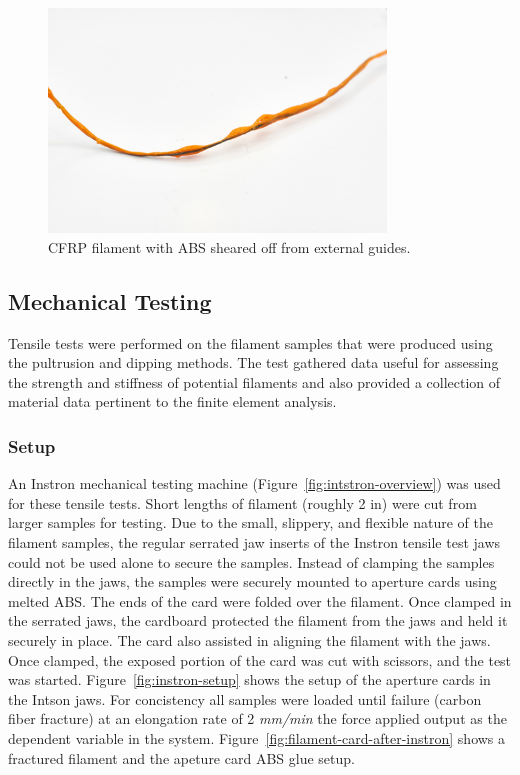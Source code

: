 \begin{figure}[htp]
    \centering
    \includegraphics[width=0.8\textwidth]{./figures/filament-dipping-shear}
    \caption{CFRP filament with ABS sheared off from external guides.}
    \label{fig:filament-dipping-shear}
\end{figure}

\clearpage

\subsection{Mechanical Testing}

\indent

Tensile tests were performed on the filament samples that were produced using the pultrusion and dipping methods. The test gathered data useful for assessing the strength and stiffness of potential filaments and also provided a collection of material data pertinent to the finite element analysis.\\

\subsubsection{Setup}

\indent

An Instron mechanical testing machine (Figure~\ref{fig:intstron-overview}) was used for these tensile tests. Short lengths of filament (roughly 2 in) were cut from larger samples for testing. Due to the small, slippery,  and flexible nature of the filament samples, the regular serrated jaw inserts of the Instron tensile test jaws could not be used alone to secure the samples. Instead of clamping the samples directly in the jaws, the samples were securely mounted to aperture cards using melted ABS. The ends of the card were folded over the filament. Once clamped in the serrated jaws, the cardboard protected the filament from the jaws and held it securely in place. The card also assisted in aligning the filament with the jaws. Once clamped, the exposed portion of the card was cut with scissors, and the test was started. Figure~\ref{fig:instron-setup} shows the setup of the aperture cards in the Intson jaws. For concistency all samples were loaded until failure (carbon fiber fracture) at an elongation rate of 2 \textit{mm/min} the force applied output as the dependent variable in the system. Figure~\ref{fig:filament-card-after-instron} shows a fractured filament and the apeture card ABS glue setup.\\

